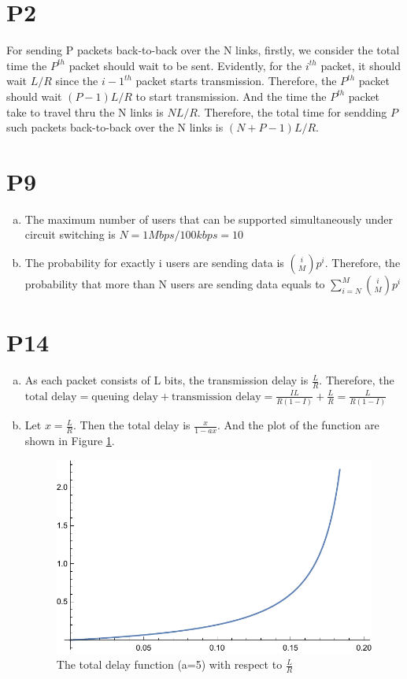 \documentclass[a4paper, 11pt]{article}
\begin{document}
\section*{P2}
For sending P packets back-to-back over the N links, firstly, we consider the total time the $P^{th}$ packet should wait to be sent. Evidently, for the $i^{th}$ packet, it should wait $L/R$ since the $i-1^{th}$ packet starts transmission. Therefore, the $P^{th}$ packet should wait $(P-1)L/R$ to start transmission. And the time the $P^{th}$ packet take to travel thru the N links is $NL/R$. Therefore, the total time for sendding $P$ such packets back-to-back over the N links is $(N+P-1)L/R$. 

\section*{P9}

\begin{enumerate}[a.]
    \item The maximum number of users that can be supported simultaneously under circuit switching is $N = 1Mbps/100kbps = 10$
    \item The probability for exactly i users are sending data is $\binom{i}{M}p^i$. Therefore, the probability that more than N users are sending data equals to $\sum_{i=N}^{M}\binom{i}{M}p^i$
\end{enumerate}
\newpage
\section*{P14}
\begin{enumerate}[a.]
    \item As each packet consists of L bits, the transmission delay is $\frac{L}{R}$. Therefore, the $\text{total delay} = \text{queuing delay} + \text{transmission delay} = \frac{IL}{R(1-I)} + \frac{L}{R} = \frac{L}{R(1-I)}$
    \item Let $x = \frac{L}{R}$. Then the total delay is $\frac{x}{1-ax}$. And the plot of the function are shown in Figure \ref{fig:del}.
        \begin{figure}[htbp]
            \centering
            \includegraphics[width=.6\linewidth]{plot.pdf}
            \caption{The total delay function (a=5) with respect to $\frac{L}{R}$}
            \label{fig:del}
        \end{figure}
\end{enumerate}
\end{document}

